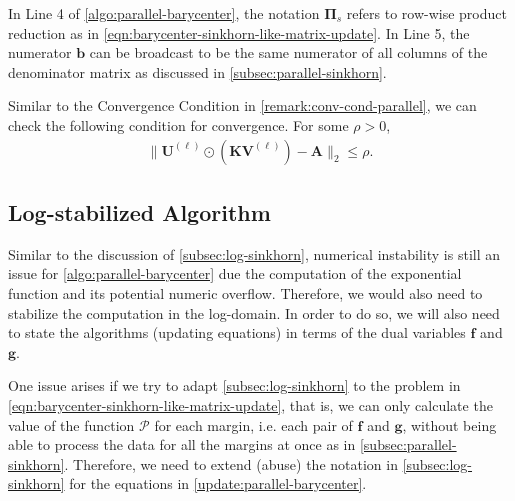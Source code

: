 \begin{remark}[]
  In Line 4 of \cref{algo:parallel-barycenter},
  the notation $\boldsymbol\Pi_s$ refers to row-wise product reduction
  as in \cref{eqn:barycenter-sinkhorn-like-matrix-update}.
  In Line 5, the numerator $\mathbf{b}$ can be broadcast to be the same numerator of all columns of the denominator matrix
  as discussed in \cref{subsec:parallel-sinkhorn}.
\end{remark}

\begin{remark}
  Similar to the Convergence Condition in \cref{remark:conv-cond-parallel},
  we can check the following condition for convergence. For some $\rho > 0$,
  \begin{equation*}
    \begin{aligned}
      \lVert
      \mathbf{U}^{(\ell)} \odot \left(\mathbf{K} \mathbf{V}^{(\ell)}\right) - \mathbf{A}
      \rVert_2 \le \rho.
    \end{aligned}
  \end{equation*}
\end{remark}






















\subsection{Log-stabilized Algorithm}\label{subsec:log-barycenter}


Similar to the discussion of \cref{subsec:log-sinkhorn},
numerical instability is still an issue for \cref{algo:parallel-barycenter}
due the computation of the exponential function and its potential numeric overflow.
Therefore, we would also need to stabilize the computation in the log-domain.
In order to do so, we will also need to state the algorithms (updating equations)
in terms of the dual variables $\mathbf{f}$ and $\mathbf{g}$.

One issue arises if we try to adapt \cref{subsec:log-sinkhorn} to the problem in
\cref{eqn:barycenter-sinkhorn-like-matrix-update},
that is,
we can only calculate the value of the function $\mathcal{P}$ for each margin,
i.e. each pair of $\mathbf{f}$ and $\mathbf{g}$,
without being able to process the data for all the margins at once as in \cref{subsec:parallel-sinkhorn}.
Therefore, we need to extend (abuse) the notation in \cref{subsec:log-sinkhorn}
for the equations in \cref{update:parallel-barycenter}.

